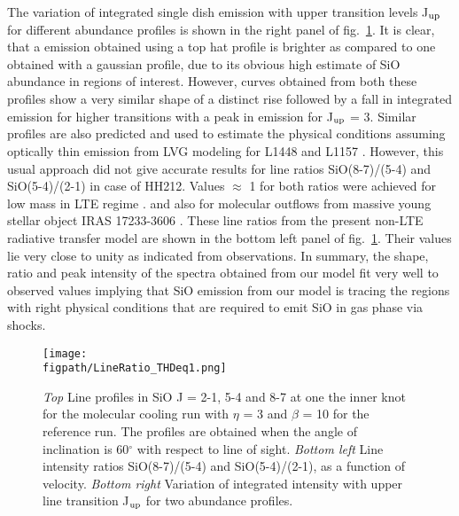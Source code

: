 \documentclass[useAMS,usenatbib]{mn2e}
\newcommand{\figpath}{PFIGS/}
\begin{document}
The variation of integrated single dish emission with upper transition
levels J$_{\rm up}$ for different abundance profiles is shown in the
right panel of fig.~\ref{fig:lineratio}. It is clear, that a emission
obtained using a top hat profile is brighter as compared to one
obtained with a gaussian profile, due to its obvious high estimate of
SiO abundance in regions of interest. However, curves obtained from
both these profiles show a very similar shape of a distinct rise followed by a fall in
integrated emission for higher transitions with a peak in
emission for J$_{\rm up}$ = 3. Similar profiles are also predicted and
used to estimate the physical conditions assuming optically
thin emission from LVG modeling for L1448 and L1157
\cite{Nisini:2007p13128}. However, this usual approach did not give
accurate results for line ratios SiO(8-7)/(5-4) and SiO(5-4)/(2-1)
in case of HH212. Values $\approx$ 1 for both ratios were
achieved for low mass in LTE regime \citep{Cabrit:2007p13804, Lee:2008p13697}. 
and also for molecular outflows from massive
young stellar object IRAS 17233-3606 \cite{Leurini:2013p13165}.
These line ratios from the present
non-LTE radiative transfer model are shown in the bottom left panel of
fig.~\ref{fig:lineratio}. Their values lie very close to unity as
indicated from observations. 
In summary, the shape, ratio and peak intensity of the spectra
obtained from our model fit very well to observed values implying
that SiO emission from our model is tracing the regions with right physical
conditions that are required to emit SiO in gas phase via shocks. 

\begin{figure*}
 \texttt{[image: \\figpath/LineRatio\_THDeq1.png]}
 \caption{{\em{Top}} Line profiles in SiO J = 2-1, 5-4 and 8-7 at one
   the inner knot for the molecular cooling run with $\eta$ = 3 and
   $\beta$ = 10 for the reference run. The profiles are
   obtained when the angle of inclination is 60$^{\circ}$ with respect
 to line of sight. {\em{Bottom left}} Line intensity ratios SiO(8-7)/(5-4)
and SiO(5-4)/(2-1), as a function of velocity. {\em{Bottom right}}
Variation of integrated intensity with upper line transition J$_{\rm
  up}$ for two abundance profiles.}
\label{fig:lineratio}
\end{figure*}
\end{document}
